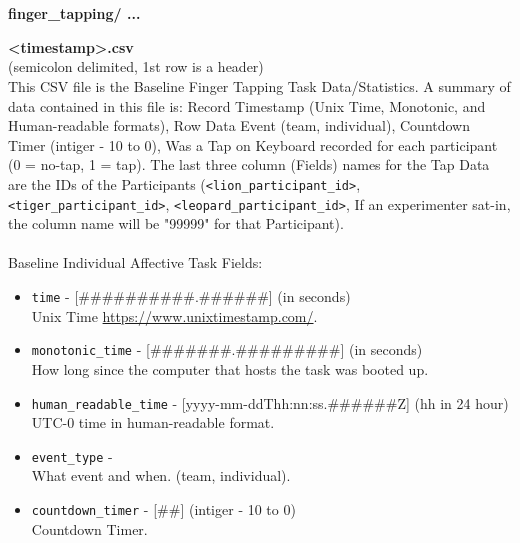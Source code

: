 \begin{description}
\begin{addmargin}[0em]{0em}
    \end{addmargin} %


    \textbf{\\\\}
    \begin{addmargin}[0em]{0em} %
        \textbf{finger\_tapping/ ...}

        \begin{addmargin}[1em]{0em} %
            \textbf{<timestamp>.csv}\\(semicolon delimited, 1st row is a header)\\
            This CSV file is the Baseline Finger Tapping Task Data/Statistics.
            A summary of data contained in this file is: Record Timestamp (Unix Time, Monotonic, and Human-readable formats),
            Row Data Event (team, individual), Countdown Timer (intiger - 10 to 0), Was a Tap on Keyboard recorded for each participant (0 = no-tap, 1 = tap).
            The last three column (Fields) names for the Tap Data are the IDs of the Participants (\verb|<lion_participant_id>|, \verb|<tiger_participant_id>|,
            \verb|<leopard_participant_id>|, If an experimenter sat-in, the column name will be "99999" for that Participant).\\\\
            Baseline Individual Affective Task Fields:
            \begin{itemize}
                \item \verb|time| - [\#\#\#\#\#\#\#\#\#\#.\#\#\#\#\#\#] (in seconds)\\Unix Time \href{https://www.unixtimestamp.com/}{https://www.unixtimestamp.com/}.
                \item \verb|monotonic_time| - [\#\#\#\#\#\#\#.\#\#\#\#\#\#\#\#\#] (in seconds)\\How long since the computer that hosts the task was booted up.
                \item \verb|human_readable_time| - [yyyy-mm-ddThh:nn:ss.\#\#\#\#\#\#Z] (hh in 24 hour)\\ UTC-0 time in human-readable format.
                \item \verb|event_type| -\\What event and when. (team, individual).
                \item \verb|countdown_timer| - [\#\#] (intiger - 10 to 0)\\Countdown Timer.

\end{itemize}
\end{addmargin}
\end{addmargin}
\end{description}
